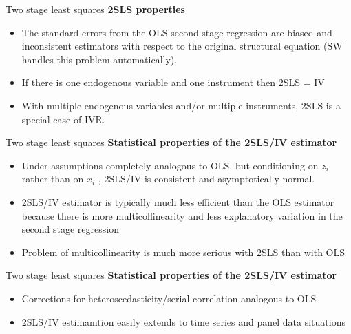 \documentclass[usenames,dvipsnames]{beamer}
\begin{document}
\begin{frame}{Two stage least squares}
\textbf{2SLS properties}
\vspace{0.3cm}
\begin{itemize}
\item The standard errors from the OLS second stage regression are biased and inconsistent estimators with respect to the original structural equation (SW handles this problem automatically).
\vspace{0.3cm}
\item If there is one endogenous variable and one instrument then 2SLS = IV
\vspace{0.3cm}
\item With multiple endogenous variables and/or multiple instruments, 2SLS is a special case of IVR.
\vspace{0.3cm}
\end{itemize}
\end{frame}
\begin{frame}{Two stage least squares}
\textbf{Statistical properties of the 2SLS/IV estimator}
\vspace{0.3cm}
\begin{itemize}
\item Under assumptions completely analogous to OLS, but conditioning on $z_i$ rather than on $x_i$ , 2SLS/IV is consistent and asymptotically normal.
\vspace{0.3cm}
\item 2SLS/IV estimator is typically much less efficient than the OLS estimator because there is more multicollinearity and less explanatory variation in the second stage regression
\vspace{0.3cm}
\item Problem of multicollinearity is much more serious with 2SLS than with OLS
\end{itemize}
\end{frame}
\begin{frame}{Two stage least squares}
\textbf{Statistical properties of the 2SLS/IV estimator}
\vspace{0.5cm}
\begin{itemize}
\item Corrections for heteroscedasticity/serial correlation analogous to OLS
\vspace{0.3cm}
\item 2SLS/IV estimamtion easily extends to time series and panel data situations
\end{itemize}
\end{frame}
\end{document}
